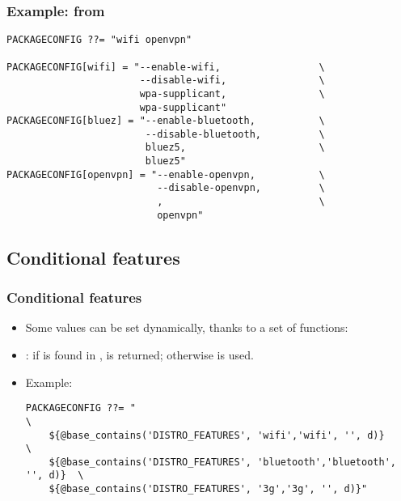 \begin{frame}[fragile]
  \frametitle{Example: from }
  \begin{block}{}
  \begin{verbatim}
PACKAGECONFIG ??= "wifi openvpn"

PACKAGECONFIG[wifi] = "--enable-wifi,                 \
                       --disable-wifi,                \
                       wpa-supplicant,                \
                       wpa-supplicant"
PACKAGECONFIG[bluez] = "--enable-bluetooth,           \
                        --disable-bluetooth,          \
                        bluez5,                       \
                        bluez5"
PACKAGECONFIG[openvpn] = "--enable-openvpn,           \
                          --disable-openvpn,          \
                          ,                           \
                          openvpn"
  \end{verbatim}
  \end{block}
\end{frame}

\subsection{Conditional features}

\begin{frame}[fragile]
  \frametitle{Conditional features}
  \begin{itemize}
    \item Some values can be set dynamically, thanks to a set of
      functions:
    \item {}: if  is found in
      \code{variable},  is returned; otherwise
       is used.
    \item Example:
      \begin{block}{}
      \begin{verbatim}
PACKAGECONFIG ??= "                                                       \
    ${@base_contains('DISTRO_FEATURES', 'wifi','wifi', '', d)}            \
    ${@base_contains('DISTRO_FEATURES', 'bluetooth','bluetooth', '', d)}  \
    ${@base_contains('DISTRO_FEATURES', '3g','3g', '', d)}"
      \end{verbatim}
      \end{block}
  \end{itemize}
\end{frame}

